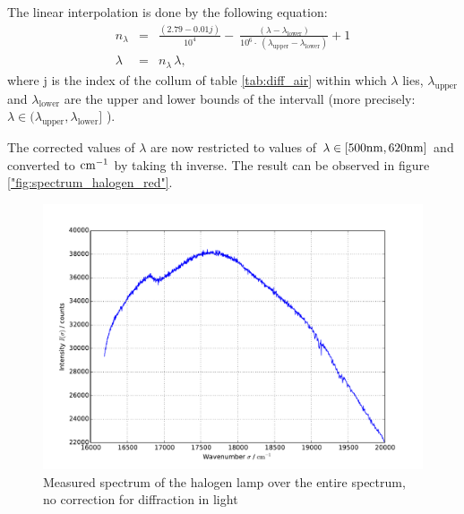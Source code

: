 The linear interpolation is done by the following equation:
\begin{eqnarray}
    n_\lambda &=& \frac{(2.79 - 0.01 j)}{10 ^{4}} - \
    \frac{(\lambda - \lambda_\mathrm{lower})} {10^{6} \cdot \
(\lambda_\mathrm{upper} - \lambda_\mathrm{lower})} + 1 \\
    \lambda &=& n_\lambda \, \lambda,
    \label{eqn:lin_interpol}
\end{eqnarray}
where j is the index of the collum of table \ref{tab:diff_air} within which $\lambda$ lies, 
$\lambda_\mathrm{upper}$ and $\lambda_\mathrm{lower}$ are the upper and lower bounds of the 
intervall (more precisely: $\lambda \in (\lambda_\mathrm{upper}, \lambda_\mathrm{lower}]$ ). 

The corrected values of $\lambda$ are now restricted to values of 
$\lambda \in [500\mathrm{nm}, 620\mathrm{nm}]$ and converted to $\mathrm{cm^{-1}}$ by taking th inverse. The result 
can be observed in figure \ref{"fig:spectrum_halogen_red"}.
\begin{figure}
\centering
\includegraphics[width=\pltw]{analysis/figures/halogen_red.pdf}
\caption{Measured spectrum of the halogen lamp over the entire spectrum, no correction for 
diffraction in light}
\label{fig:spectrum_halogen_red}
\end{figure}


